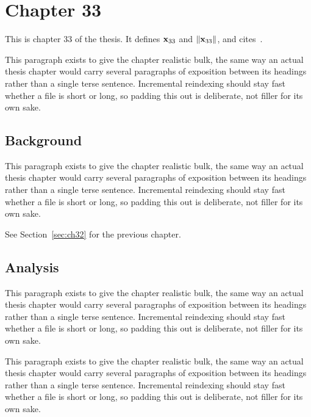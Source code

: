 \section{Chapter 33}
\label{sec:ch33}

This is chapter 33 of the thesis. It defines $\mathbf{x}_{33}$ and $\lVert \mathbf{x}_{33} \rVert$, and cites~\cite{ref1}.

This paragraph exists to give the chapter realistic bulk, the same way an actual thesis chapter would carry several paragraphs of exposition between its headings rather than a single terse sentence. Incremental reindexing should stay fast whether a file is short or long, so padding this out is deliberate, not filler for its own sake.

\subsection{Background}
\label{sec:ch33:background}

This paragraph exists to give the chapter realistic bulk, the same way an actual thesis chapter would carry several paragraphs of exposition between its headings rather than a single terse sentence. Incremental reindexing should stay fast whether a file is short or long, so padding this out is deliberate, not filler for its own sake.

See Section~\ref{sec:ch32} for the previous chapter.

\subsection{Analysis}
\label{sec:ch33:analysis}

This paragraph exists to give the chapter realistic bulk, the same way an actual thesis chapter would carry several paragraphs of exposition between its headings rather than a single terse sentence. Incremental reindexing should stay fast whether a file is short or long, so padding this out is deliberate, not filler for its own sake.

This paragraph exists to give the chapter realistic bulk, the same way an actual thesis chapter would carry several paragraphs of exposition between its headings rather than a single terse sentence. Incremental reindexing should stay fast whether a file is short or long, so padding this out is deliberate, not filler for its own sake.
